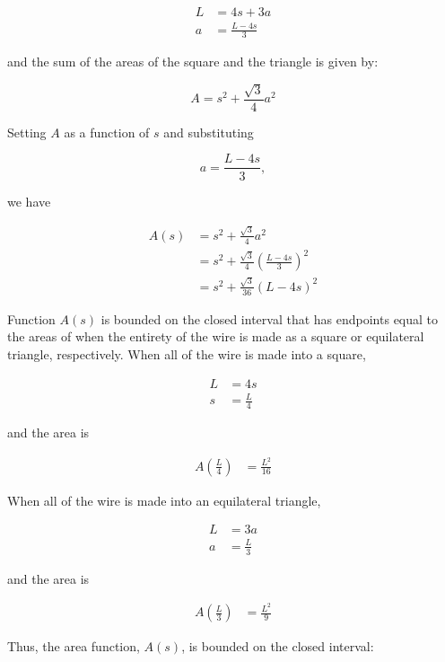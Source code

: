 \documentclass{article}
\begin{document}
    \begin{align*}
        L &= 4s + 3a \\
        a &= \frac{L-4s}{3}
    \end{align*}

    and the sum of the areas of the square and the triangle is given by:

    \[
        A = s^2 + \frac{\sqrt{3}}{4}a^2
    \]

    Setting $A$ as a function of $s$ and substituting

    \[
        a = \frac{L-4s}{3},
    \]

    \pagebreak

    we have

    \begin{align*}
        A(s)    &= s^2 + \frac{\sqrt{3}}{4}a^2 \\
                &= s^2 + \frac{\sqrt{3}}{4} \left(\frac{L-4s}{3}\right)^2 \\
                &= s^2 + \frac{\sqrt{3}}{36}(L-4s)^2
    \end{align*}

    Function $A(s)$ is bounded on the closed interval that has endpoints equal to the areas of when the entirety of the wire is made as a square or equilateral triangle, respectively. When all of the wire is made into
    a square,

    \begin{align*}
        L &= 4s \\
        s &= \frac{L}{4}
    \end{align*}

    and the area is

    \begin{align*}
        A\left(\frac{L}{4}\right)   &= \frac{L^2}{16}
    \end{align*}

    When all of the wire is made into an equilateral triangle,

    \begin{align*}
        L   &= 3a \\
        a   &= \frac{L}{3}
    \end{align*}

    and the area is

    \begin{align*}
        A\left(\frac{L}{3}\right)   &= \frac{L^2}{9}
    \end{align*}

    Thus, the area function, $A(s)$, is bounded on the closed interval:
\end{document}
